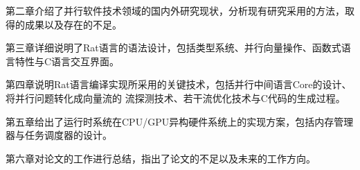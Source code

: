 第二章介绍了并行软件技术领域的国内外研究现状，分析现有研究采用的方法，取得的成果以及存在的不足。

第三章详细说明了Rat语言的语法设计，包括类型系统、并行向量操作、函数式语言特性与C语言交互界面。

第四章说明Rat语言编译实现所采用的关键技术，包括并行中间语言Core的设计、将并行问题转化成向量流的
流探测技术、若干流优化技术与C代码的生成过程。

第五章给出了运行时系统在CPU/GPU异构硬件系统上的实现方案，包括内存管理器与任务调度器的设计。

第六章对论文的工作进行总结，指出了论文的不足以及未来的工作方向。



